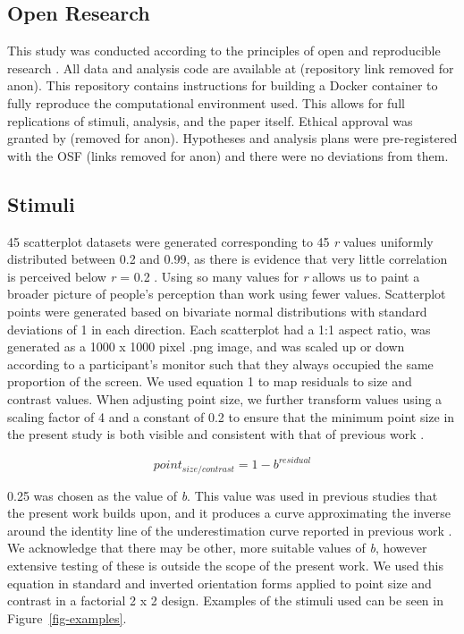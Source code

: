 \documentclass[manuscript, review, anonymous, screen]{acmart}
\begin{document}
\hypertarget{sec-open-research}{%
\subsection{Open Research}\label{sec-open-research}}

This study was conducted according to the principles of open and
reproducible research \citep{ayris_2018}. All data and analysis code are
available at (repository link removed for anon). This repository
contains instructions for building a Docker container to fully reproduce
the computational environment used. This allows for full replications of
stimuli, analysis, and the paper itself. Ethical approval was granted by
(removed for anon). Hypotheses and analysis plans were pre-registered
with the OSF (links removed for anon) and there were no deviations from
them.

\hypertarget{sec-scatter-gen}{%
\subsection{Stimuli}\label{sec-scatter-gen}}

45 scatterplot datasets were generated corresponding to 45 \emph{r}
values uniformly distributed between 0.2 and 0.99, as there is evidence
that very little correlation is perceived below \emph{r} = 0.2
\citep{strahan_1978, bobko_1979, cleveland_1982}. Using so many values
for \emph{r} allows us to paint a broader picture of people's perception
than work using fewer values. Scatterplot points were generated based on
bivariate normal distributions with standard deviations of 1 in each
direction. Each scatterplot had a 1:1 aspect ratio, was generated as a
1000 x 1000 pixel .png image, and was scaled up or down according to a
participant's monitor such that they always occupied the same proportion
of the screen. We used equation 1 to map residuals to size and contrast
values. When adjusting point size, we further transform values using a
scaling factor of 4 and a constant of 0.2 to ensure that the minimum
point size in the present study is both visible and consistent with that
of previous work \citep{strain_2023, strain_2023b}.

\begin{equation}
  point_{size/contrast} = 1 - b^{residual}
\end{equation}

0.25 was chosen as the value of \emph{b}. This value was used in
previous studies that the present work builds upon, and it produces a
curve approximating the inverse around the identity line of the
underestimation curve reported in previous work
\citep{rensink_2017, strain_2023, strain_2023b}. We acknowledge that
there may be other, more suitable values of \emph{b}, however extensive
testing of these is outside the scope of the present work. We used this
equation in standard and inverted orientation forms applied to point
size and contrast in a factorial 2 x 2 design. Examples of the stimuli
used can be seen in Figure~\ref{fig-examples}.
\end{document}
